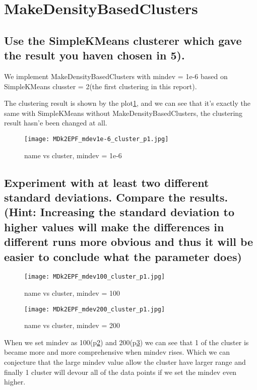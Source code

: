 \documentclass{article}
\begin{document}
\section{MakeDensityBasedClusters}

\subsection{Use the SimpleKMeans clusterer which gave the result you haven chosen in 5).}

We implement MakeDensityBasedClusters with mindev = 1e-6 based on SimpleKMeans clusster = 2(the first clustering in this report).

The clustering result is shown by the plot\ref{fig:MDk2EPF_mdev1e-6_cluster_p1}, and we can see that it's exactly the same with SimpleKMeans without MakeDensityBasedClusters, the clustering result hasn'e been changed at all.
\begin{figure}[H]
\centering
\texttt{[image: MDk2EPF\_mdev1e-6\_cluster\_p1.jpg]}
\caption{\label{fig:MDk2EPF_mdev1e-6_cluster_p1} name vs cluster, mindev = 1e-6}
\end{figure}

\subsection{Experiment with at least two different standard deviations. Compare the results. (Hint: Increasing the standard deviation to higher values will make the differences in different runs more obvious and thus it will be easier to conclude what the parameter does)}

\begin{figure}[H]
\centering
\texttt{[image: MDk2EPF\_mdev100\_cluster\_p1.jpg]}
\caption{\label{fig:MDk2EPF_mdev100_cluster_p1} name vs cluster, mindev = 100}
\end{figure}
\begin{figure}[H]
\centering
\texttt{[image: MDk2EPF\_mdev200\_cluster\_p1.jpg]}
\caption{\label{fig:MDk2EPF_mdev200_cluster_p1} name vs cluster, mindev = 200}
\end{figure}

When we set mindev as 100(p\ref{fig:MDk2EPF_mdev100_cluster_p1}) and 200(p\ref{fig:MDk2EPF_mdev200_cluster_p1}) we can see that 1 of the cluster is became more and more comprehensive when mindev rises. Which we can conjecture that the large mindev value allow the cluster have larger range and finally 1 cluster will devour  all of the data points if we set the mindev even higher.
\end{document}
